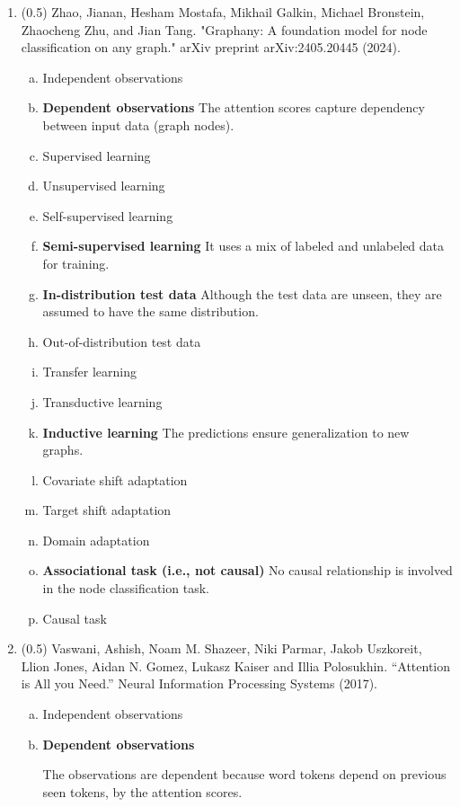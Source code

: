 \documentclass{article}
\begin{document}
\begin{enumerate}
\item (0.5) Zhao, Jianan, Hesham Mostafa, Mikhail Galkin, Michael Bronstein, Zhaocheng Zhu, and Jian Tang. "Graphany: A foundation model for node classification on any graph." arXiv preprint arXiv:2405.20445 (2024).
\begin{enumerate}[(a)]
\item Independent observations
\item \textbf{Dependent observations}
The attention scores capture dependency between input data (graph nodes).
\item Supervised learning
\item Unsupervised learning
\item Self-supervised learning
\item \textbf{Semi-supervised learning} It uses a mix of labeled and unlabeled data for training.
\item \textbf{In-distribution test data} Although the test data are unseen, they are assumed to have the same distribution.
\item Out-of-distribution test data
\item Transfer learning
\item Transductive learning
\item \textbf{Inductive  learning}
The predictions ensure generalization to new graphs.
\item Covariate shift adaptation
\item Target shift adaptation
\item Domain adaptation
\item \textbf{Associational task (i.e., not causal)} No causal relationship is involved in the node classification task.
\item Causal task
\end{enumerate}

\newpage

\item (0.5) Vaswani, Ashish, Noam M. Shazeer, Niki Parmar, Jakob Uszkoreit, Llion Jones, Aidan N. Gomez, Lukasz Kaiser and Illia Polosukhin. “Attention is All you Need.” Neural Information Processing Systems (2017).
\begin{enumerate}[(a)]
\item Independent observations
\item \textbf{Dependent observations}

The observations are dependent because word tokens depend on previous seen
tokens, by the attention scores.


\end{enumerate}
\end{enumerate}
\end{document}
